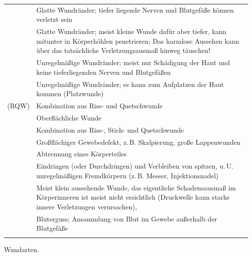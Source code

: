 {{}{
\begin{tabulary}{\linewidth}{LL}\toprule\addlinespace
\noindent{}
&
Glatte Wundränder; tiefer liegende Nerven und Blutgefäße können verletzt sein
\\\addlinespace
\noindent{}
&
Glatte Wundränder; meist kleine Wunde dafür aber tiefer, kann mitunter in
Körperhöhlen penetrieren; Das harmlose Aussehen kann über
das tatsächliche Verletzungsausmaß hinweg täuschen!
\\\addlinespace 
\noindent{}
&
Unregelmäßige Wundränder; meist nur Schädigung der Haut und
	keine tieferliegenden Nerven und Blutgefäßen
\\\addlinespace
\noindent{}
&
Unregelmäßige Wundränder; es kann zum Aufplatzen der Haut kommen (Platzwunde)
\\\addlinespace
\noindent{} (RQW)
&
Kombination aus Riss- und Quetschwunde
\\\addlinespace
\noindent{} 
&
Oberflächliche Wunde
\\\addlinespace
\noindent{} 
&
Kombination aus Riss-, Stich- und Quetschwunde
\\\addlinespace
\noindent{} 
&
Großflächiger Gewebedefekt, z.\,B. Skalpierung, große Lappenwunden
\\\addlinespace
\noindent{} 
&
Abtrennung eines Körperteiles
\\\addlinespace
\noindent{} 
&
Eindringen (oder Durchdringen) und Verbleiben von spitzen,
u.\,U. unregelmäßigen Fremdkörpern (z.\,B. Messer,
Injektionsnadel) \\\addlinespace 
\noindent{} 
&
Meist klein aussehende Wunde, das eigentliche Schadensausmaß im Körperinneren
ist meist nicht ersichtlich (Druckwelle kann starke innere
Verletzungen verursachen),
\\\addlinespace
\noindent{} 
&
Bluterguss; Ansammlung von Blut im Gewebe außerhalb der Blutgefäße 
\\\addlinespace\bottomrule
\end{tabulary}
}{Wundarten.}{}

}


